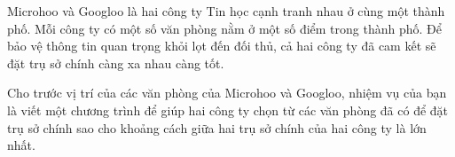 Microhoo và Googloo là hai công ty Tin học cạnh tranh nhau ở cùng một thành phố. Mỗi công ty có một số văn phòng nằm ở một số điểm trong thành phố. Để bảo vệ thông tin quan trọng khỏi lọt đến đối thủ, cả hai công ty đã cam kết sẽ đặt trụ sở chính càng xa nhau càng tốt.  

   Cho trước vị trí của các văn phòng của Microhoo và Googloo, nhiệm vụ của bạn là viết một chương trình để giúp hai công ty chọn từ các văn phòng đã có để đặt trụ sở chính sao cho khoảng cách giữa hai trụ sở chính của hai công ty là lớn nhất.  

\